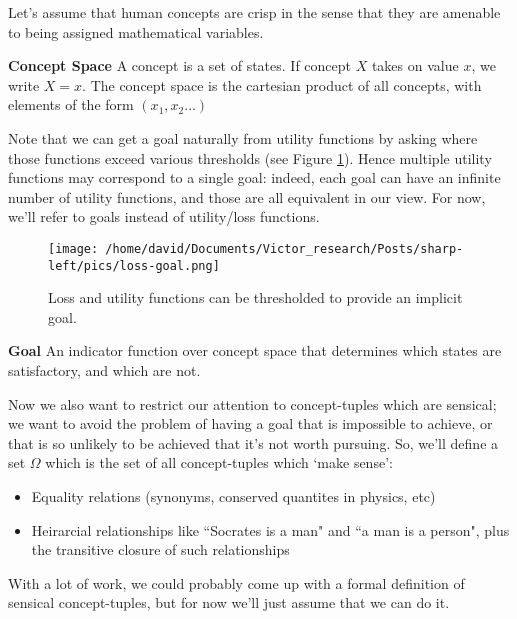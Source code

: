 \documentclass{article}
\begin{document}
Let's assume that human concepts are crisp in the sense that they are amenable to being assigned mathematical variables.

\begin{definition}{\textbf{Concept Space}}
    A concept is a set of states. If concept $X$ takes on value $x$, we write $X=x$.
    The concept space is the cartesian product of all concepts, with elements of the form $(x_1,x_2\dots)$
\end{definition}

Note that we can get a goal naturally from utility functions by asking where those functions exceed various thresholds (see Figure \ref{fig:loss-goal}). Hence multiple utility functions may correspond to a single goal: indeed, each goal can have an infinite number of utility functions, and those are all equivalent in our view. For now, we'll refer to goals instead of utility/loss functions.

\begin{figure}[ht]
    \centering
    \texttt{[image: /home/david/Documents/Victor\_research/Posts/sharp-left/pics/loss-goal.png]} 
    \caption{Loss and utility functions can be thresholded to provide an implicit goal.}
    \label{fig:loss-goal} 
\end{figure}

\begin{definition}{\textbf{Goal}}
    An indicator function over concept space that determines which states are satisfactory, and which are not.
\end{definition}

Now we also want to restrict our attention to concept-tuples which are sensical; we want to avoid the problem of having a goal that is impossible to achieve, or that is so unlikely to be achieved that it's not worth pursuing. So, we'll define a set $\Omega$ which is the set of all concept-tuples which `make sense':
\begin{itemize}
    \item Equality relations (synonyms, conserved quantites in physics, etc)
    \item Heirarcial relationships like ``Socrates is a man" and ``a man is a person", plus the transitive closure of such relationships
\end{itemize}

With a lot of work, we could probably come up with a formal definition of sensical concept-tuples, but for now we'll just assume that we can do it.
\end{document}
